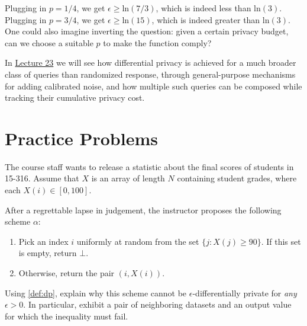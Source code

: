 \documentclass[11pt]{article}
\newcommand{\courseurl}{https://15316-cmu.github.io/2026/}
\begin{document}
Plugging in $p = 1/4$, we get $\epsilon \geq \mathrm{ln}(7/3)$, which is indeed
less than $\mathrm{ln}(3)$.  Plugging in $p = 3/4$, we get
$\epsilon \geq \mathrm{ln}(15)$, which is indeed greater than $\mathrm{ln}(3)$.
One could also imagine inverting the question: given a certain privacy budget,
can we choose a suitable $p$ to make the function comply?

In \href{\courseurl/lectures/23-dpmechanisms.pdf}{Lecture 23} we will see how
differential privacy is achieved for a much broader class of queries than
randomized response, through general-purpose mechanisms for adding calibrated
noise, and how multiple such queries can be composed while tracking their
cumulative privacy cost.

\section{Practice Problems}

\begin{task}\rm
  The course staff wants to release a statistic about the final scores of
  students in 15-316.  Assume that $X$ is an array of length $N$ containing
  student grades, where each $X(i) \in [0, 100]$.

  After a regrettable lapse in judgement, the instructor proposes the following
  scheme $\alpha$:
  \begin{enumerate}
  \item Pick an index $i$ uniformly at random from the set
    $\{j : X(j) \geq 90\}$.  If this set is empty, return $\bot$.
  \item Otherwise, return the pair $(i, X(i))$.
  \end{enumerate}
  Using \autoref{def:dp}, explain why this scheme cannot be
  $\epsilon$-differentially private for \emph{any} $\epsilon > 0$.  In
  particular, exhibit a pair of neighboring datasets and an output value for
  which the inequality must fail.
\end{task}
\end{document}
